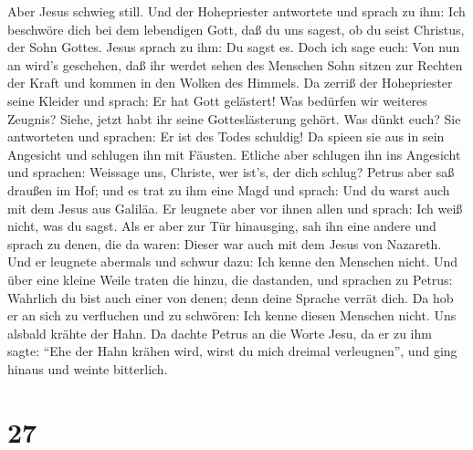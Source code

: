 Aber Jesus schwieg still. Und der Hohepriester antwortete und sprach zu
ihm: Ich beschwöre dich bei dem lebendigen Gott, daß du uns sagest, ob
du seist Christus, der Sohn Gottes.  Jesus sprach zu ihm:
Du sagst es. Doch ich sage euch: Von nun an wird's geschehen, daß ihr
werdet sehen des Menschen Sohn sitzen zur Rechten der Kraft und kommen
in den Wolken des Himmels.  Da zerriß der Hohepriester
seine Kleider und sprach: Er hat Gott gelästert! Was bedürfen wir
weiteres Zeugnis? Siehe, jetzt habt ihr seine Gotteslästerung gehört.
 Was dünkt euch? Sie antworteten und sprachen: Er ist des
Todes schuldig!  Da spieen sie aus in sein Angesicht und
schlugen ihn mit Fäusten. Etliche aber schlugen ihn ins Angesicht
 und sprachen: Weissage uns, Christe, wer ist's, der dich
schlug?  Petrus aber saß draußen im Hof; und es trat zu ihm
eine Magd und sprach: Und du warst auch mit dem Jesus aus Galiläa.
 Er leugnete aber vor ihnen allen und sprach: Ich weiß
nicht, was du sagst.  Als er aber zur Tür hinausging, sah
ihn eine andere und sprach zu denen, die da waren: Dieser war auch mit
dem Jesus von Nazareth.  Und er leugnete abermals und
schwur dazu: Ich kenne den Menschen nicht.  Und über eine
kleine Weile traten die hinzu, die dastanden, und sprachen zu Petrus:
Wahrlich du bist auch einer von denen; denn deine Sprache verrät dich.
 Da hob er an sich zu verfluchen und zu schwören: Ich kenne
diesen Menschen nicht. Uns alsbald krähte der Hahn.  Da
dachte Petrus an die Worte Jesu, da er zu ihm sagte: ``Ehe der Hahn
krähen wird, wirst du mich dreimal verleugnen'', und ging hinaus und
weinte bitterlich.

\hypertarget{section-26}{%
\section{27}\label{section-26}}

